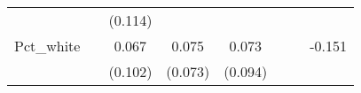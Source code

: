 \documentclass[12pt,twoside]{reedthesis}
\begin{document}
\begin{longtable}[]{@{}lccccccc@{}}
\begin{minipage}[t]{0.10\columnwidth}
  \strut
  \end{minipage} & \begin{minipage}[t]{0.10\columnwidth}\centering\strut
  \strut
  \end{minipage} & \begin{minipage}[t]{0.10\columnwidth}\centering\strut
  (0.114)\strut
  \end{minipage}\tabularnewline
  \begin{minipage}[t]{0.12\columnwidth}\raggedright\strut
  Pct\_white\strut
  \end{minipage} & \begin{minipage}[t]{0.09\columnwidth}\centering\strut
  \strut
  \end{minipage} & \begin{minipage}[t]{0.10\columnwidth}\centering\strut
  0.067\strut
  \end{minipage} & \begin{minipage}[t]{0.10\columnwidth}\centering\strut
  0.075\strut
  \end{minipage} & \begin{minipage}[t]{0.10\columnwidth}\centering\strut
  0.073\strut
  \end{minipage} & \begin{minipage}[t]{0.10\columnwidth}\centering\strut
  \strut
  \end{minipage} & \begin{minipage}[t]{0.10\columnwidth}\centering\strut
  \strut
  \end{minipage} & \begin{minipage}[t]{0.10\columnwidth}\centering\strut
  -0.151\strut
  \end{minipage}\tabularnewline
  \begin{minipage}[t]{0.12\columnwidth}\raggedright\strut
  \strut
  \end{minipage} & \begin{minipage}[t]{0.09\columnwidth}\centering\strut
  \strut
  \end{minipage} & \begin{minipage}[t]{0.10\columnwidth}\centering\strut
  (0.102)\strut
  \end{minipage} & \begin{minipage}[t]{0.10\columnwidth}\centering\strut
  (0.073)\strut
  \end{minipage} & \begin{minipage}[t]{0.10\columnwidth}\centering\strut
  (0.094)\strut
  \end{minipage} & \begin{minipage}[t]{0.10\columnwidth}\centering\strut

\end{minipage}
\end{longtable}
\end{document}
